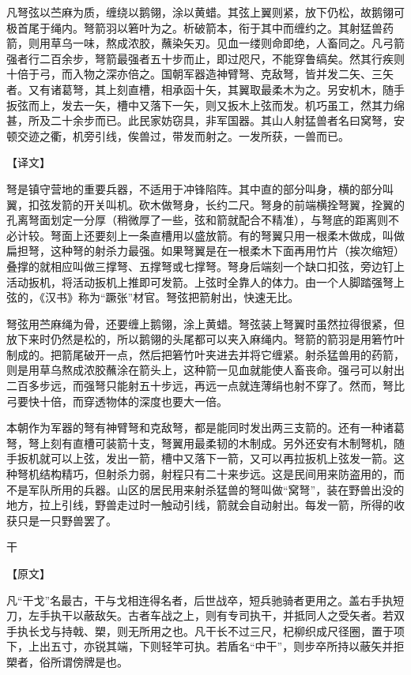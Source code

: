 \documentclass[12pt,UTF8]{ctexbook}
\begin{document}
凡弩弦以苎麻为质，缠绕以鹅翎，涂以黄蜡。其弦上翼则紧，放下仍松，故鹅翎可极首尾于绳内。弩箭羽以箬叶为之。析破箭本，衔于其中而缠约之。其射猛兽药箭，则用草乌一味，熬成浓胶，蘸染矢刃。见血一缕则命即绝，人畜同之。凡弓箭强者行二百余步，弩箭最强者五十步而止，即过咫尺，不能穿鲁缟矣。然其行疾则十倍于弓，而入物之深亦倍之。国朝军器造神臂弩、克敌弩，皆并发二矢、三矢者。又有诸葛弩，其上刻直槽，相承函十矢，其翼取最柔木为之。另安机木，随手扳弦而上，发去一矢，槽中又落下一矢，则又扳木上弦而发。机巧虽工，然其力绵甚，所及二十余步而已。此民家妨窃具，非军国器。其山人射猛兽者名曰窝弩，安顿交迹之衢，机旁引线，俟兽过，带发而射之。一发所获，一兽而已。

【译文】

弩是镇守营地的重要兵器，不适用于冲锋陷阵。其中直的部分叫身，横的部分叫翼，扣弦发箭的开关叫机。砍木做弩身，长约二尺。弩身的前端横拴弩翼，拴翼的孔离弩面划定一分厚（稍微厚了一些，弦和箭就配合不精准），与弩底的距离则不必计较。弩面上还要刻上一条直槽用以盛放箭。有的弩翼只用一根柔木做成，叫做扁担弩，这种弩的射杀力最强。如果弩翼是在一根柔木下面再用竹片（挨次缩短）叠撑的就相应叫做三撑弩、五撑弩或七撑弩。弩身后端刻一个缺口扣弦，旁边钉上活动扳机，将活动扳机上推即可发箭。上弦时全靠人的体力。由一个人脚踏强弩上弦的，《汉书》称为“蹶张”材官。弩弦把箭射出，快速无比。

弩弦用苎麻绳为骨，还要缠上鹅翎，涂上黄蜡。弩弦装上弩翼时虽然拉得很紧，但放下来时仍然是松的，所以鹅翎的头尾都可以夹入麻绳内。弩箭的箭羽是用箬竹叶制成的。把箭尾破开一点，然后把箬竹叶夹进去并将它缠紧。射杀猛兽用的药箭，则是用草乌熬成浓胶蘸涂在箭头上，这种箭一见血就能使人畜丧命。强弓可以射出二百多步远，而强弩只能射五十步远，再远一点就连薄绢也射不穿了。然而，弩比弓要快十倍，而穿透物体的深度也要大一倍。

本朝作为军器的弩有神臂弩和克敌弩，都是能同时发出两三支箭的。还有一种诸葛弩，弩上刻有直槽可装箭十支，弩翼用最柔韧的木制成。另外还安有木制弩机，随手扳机就可以上弦，发出一箭，槽中又落下一箭，又可以再拉扳机上弦发一箭。这种弩机结构精巧，但射杀力弱，射程只有二十来步远。这是民间用来防盗用的，而不是军队所用的兵器。山区的居民用来射杀猛兽的弩叫做“窝弩”，装在野兽出没的地方，拉上引线，野兽走过时一触动引线，箭就会自动射出。每发一箭，所得的收获只是一只野兽罢了。

干

【原文】

凡“干戈”名最古，干与戈相连得名者，后世战卒，短兵驰骑者更用之。盖右手执短刀，左手执干以蔽敌矢。古者车战之上，则有专司执干，并抵同人之受矢者。若双手执长戈与持戟、槊，则无所用之也。凡干长不过三尺，杞柳织成尺径圈，置于项下，上出五寸，亦锐其端，下则轻竿可执。若盾名“中干”，则步卒所持以蔽矢并拒槊者，俗所谓傍牌是也。
\end{document}

